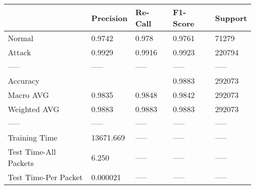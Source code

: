 \begin{tabular}{lllll}
\toprule
{} &  Precision & Re-Call & F1-Score & Support \\
\midrule
Normal                &     0.9742 &   0.978 &   0.9761 &   71279 \\
Attack                &     0.9929 &  0.9916 &   0.9923 &  220794 \\
-----                 &      ----- &   ----- &    ----- &   ----- \\
Accuracy              &            &         &   0.9883 &  292073 \\
Macro AVG             &     0.9835 &  0.9848 &   0.9842 &  292073 \\
Weighted AVG          &     0.9883 &  0.9883 &   0.9883 &  292073 \\
-----                 &      ----- &   ----- &    ----- &   ----- \\
Training Time         &  13671.669 &   ----- &    ----- &   ----- \\
Test Time-All Packets &      6.250 &   ----- &    ----- &   ----- \\
Test Time-Per Packet  &   0.000021 &   ----- &    ----- &   ----- \\
\bottomrule
\end{tabular}
